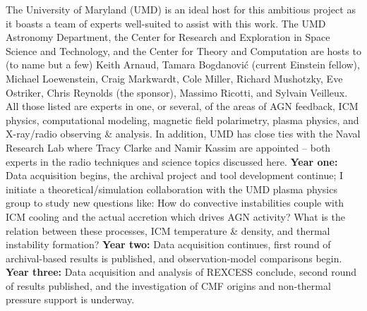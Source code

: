 \indent The University of Maryland (UMD) is an ideal host for this
ambitious project as it boasts a team of experts well-suited to assist
with this work. The UMD Astronomy Department, the Center for Research
and Exploration in Space Science and Technology, and the Center for
Theory and Computation are hosts to (to name but a few) Keith Arnaud,
Tamara Bogdanovi{\'c} (current Einstein fellow), Michael Loewenstein,
Craig Markwardt, Cole Miller, Richard Mushotzky, Eve Ostriker, Chris
Reynolds (the sponsor), Massimo Ricotti, and Sylvain Veilleux. All
those listed are experts in one, or several, of the areas of AGN
feedback, ICM physics, computational modeling, magnetic field
polarimetry, plasma physics, and X-ray/radio observing \& analysis. In
addition, UMD has close ties with the Naval Research Lab where Tracy
Clarke and Namir Kassim are appointed -- both experts in the radio
techniques and science topics discussed here. {\bf{Year one:}} Data
acquisition begins, the archival project and tool development
continue; I initiate a theoretical/simulation collaboration with the
UMD plasma physics group to study new questions like: How do
convective instabilities couple with ICM cooling and the actual
accretion which drives AGN activity?  What is the relation between
these processes, ICM temperature \& density, and thermal instability
formation? {\bf{Year two:}} Data acquisition continues, first round of
archival-based results is published, and observation-model comparisons
begin. {\bf{Year three:}} Data acquisition and analysis of REXCESS
conclude, second round of results published, and the investigation of
CMF origins and non-thermal pressure support is underway.
